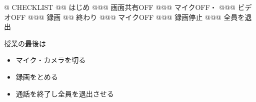 \documentclass[book,jafontscale=0.9247]{jlreq}
\begin{document}


\begin{minipage}[t]{70mm}
\begin{easylist}[checklist]
@ CHECKLIST
@@ はじめ
@@@ 画面共有OFF
@@@ マイクOFF・
@@@ ビデオOFF
@@@ 録画
@@ 終わり
@@@ マイクOFF
@@@ 録画停止
@@@ 全員を退出
\end{easylist}
\end{minipage}


\newpage



\textsf{授業の最後は}

\begin{itemize}\gtfamily
 \item マイク・カメラを切る
 \item 録画をとめる
 \item 通話を終了し全員を退出させる
\end{itemize}
\end{document}
